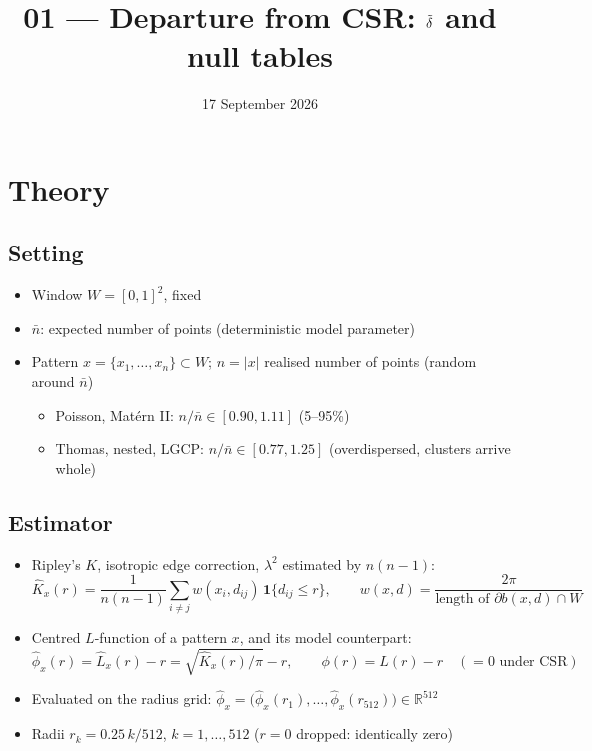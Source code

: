 \documentclass[11pt]{article}
\title{01 --- Departure from CSR: $\tilde\delta$ and null tables}
\date{17 September 2026}
\newcommand{\nb}{\bar n}
\newcommand{\R}{\mathbb R}
\begin{document}
\maketitle

\section{Theory}

\subsection*{Setting}
\begin{itemize}
  \item Window $W=[0,1]^2$, fixed
  \item $\nb$: expected number of points (deterministic model parameter)
  \item Pattern $x = \{x_1,\dots,x_n\} \subset W$; $n = |x|$ realised number of points (random around $\nb$)
  \begin{itemize}
    \item Poisson, Mat\'ern II: $n/\nb \in [0.90, 1.11]$ (5--95\%)
    \item Thomas, nested, LGCP: $n/\nb \in [0.77, 1.25]$ (overdispersed, clusters arrive whole)
  \end{itemize}
\end{itemize}

\subsection*{Estimator}
\begin{itemize}
  \item Ripley's $K$, isotropic edge correction, $\lambda^2$ estimated by $n(n-1)$:
  \[
    \hat K_x(r) = \frac{1}{n(n-1)} \sum_{i\neq j} w(x_i, d_{ij})\, \mathbf 1\{d_{ij}\le r\},
    \qquad
    w(x,d) = \frac{2\pi}{\text{length of } \partial b(x,d)\cap W}
  \]
  \item Centred $L$-function of a pattern $x$, and its model counterpart:
  \[
    \hat\phi_x(r) = \hat L_x(r) - r = \sqrt{\hat K_x(r)/\pi} - r,
    \qquad
    \phi(r) = L(r) - r \quad (= 0 \text{ under CSR})
  \]
  \item Evaluated on the radius grid: $\hat\phi_x = \big(\hat\phi_x(r_1),\dots,\hat\phi_x(r_{512})\big) \in \R^{512}$
  \item Radii $r_k = 0.25\,k/512$, $k=1,\dots,512$ ($r=0$ dropped: identically zero)
\end{itemize}
\end{document}

